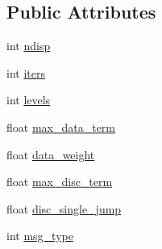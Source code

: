 \subsection*{Public Attributes}
\begin{DoxyCompactItemize}
\item 
int \hyperlink{classcv_1_1gpu_1_1StereoBeliefPropagation_a0d731e1e2cfc606e05853ad240339b85}{ndisp}
\item 
int \hyperlink{classcv_1_1gpu_1_1StereoBeliefPropagation_a468adfcd6c5453ec3b79b496d404610f}{iters}
\item 
int \hyperlink{classcv_1_1gpu_1_1StereoBeliefPropagation_abf1426daac046c64ff00b02065b15caf}{levels}
\item 
float \hyperlink{classcv_1_1gpu_1_1StereoBeliefPropagation_a40764d557deb13ec8505fdb59ea9df66}{max\-\_\-data\-\_\-term}
\item 
float \hyperlink{classcv_1_1gpu_1_1StereoBeliefPropagation_aa228ac4e9eb3ba78eb3039d972c458b1}{data\-\_\-weight}
\item 
float \hyperlink{classcv_1_1gpu_1_1StereoBeliefPropagation_ad6ecab0b3d6ddb925d08fa9030f8bc91}{max\-\_\-disc\-\_\-term}
\item 
float \hyperlink{classcv_1_1gpu_1_1StereoBeliefPropagation_a87bd96dd0ef5d823fec95a5145685b34}{disc\-\_\-single\-\_\-jump}
\item 
int \hyperlink{classcv_1_1gpu_1_1StereoBeliefPropagation_a0a7d82324e2922f8e7e826b26a447ee6}{msg\-\_\-type}
\end{DoxyCompactItemize}



